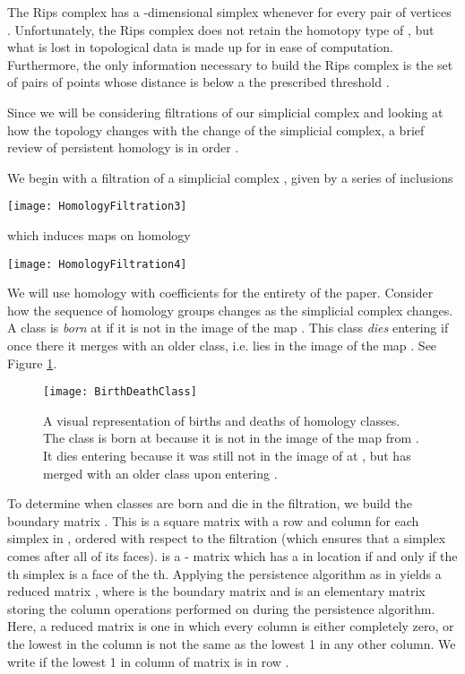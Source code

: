 \documentclass[10pt,twocolumn]{article} \usepackage{amsmath,epsf,amssymb,cite,pifont,amsthm, mathrsfs,epsfig,  bbm, amsthm,  setspace}
\renewcommand{\1}{\mathbbm{1}}
\begin{document}
The Rips complex   has a -dimensional simplex 
whenever  for every pair of vertices .
Unfortunately, the Rips complex does not retain the homotopy type of ,
but what is lost in topological data is made up for in ease of computation.
Furthermore, the only  information necessary
to build the Rips complex is the set of pairs of points whose distance is below a the prescribed threshold .


Since we will be considering filtrations of our simplicial complex and looking at how the topology
changes with the change of the simplicial complex, a brief review of persistent homology is in order \cite{Edelsbrunner2010}.

We begin with a filtration of a simplicial complex , given by a series of inclusions
\begin{center}
 \texttt{[image: HomologyFiltration3]}
\end{center}
which induces maps on homology

\begin{center}
 \texttt{[image: HomologyFiltration4]}
\end{center}
We will use homology with  coefficients for the entirety of the paper.
Consider how the sequence of homology groups changes as the simplicial complex changes.
A class  is {\em born} at  if it is not in the image of the map
.
This class {\em dies} entering  if once there it merges with an older class,
i.e. lies in the image of the map .
See Figure \ref{F:BirthDeathClass}.


\begin{figure}
 \begin{center}
\texttt{[image: BirthDeathClass]}
 \end{center}
 \caption{A visual representation of births and deaths of homology classes.
 The class  is born at  because it is not in the image of the map from .
 It dies entering  because it was still not in the image of  at ,
 but has merged with an older class upon entering .}
\label{F:BirthDeathClass}
\end{figure}

To determine when classes are born and die in the filtration, we build the boundary matrix .
This is a square matrix with a row and column for each simplex in ,
ordered with respect to the filtration (which  ensures that a simplex comes after all of its faces).
 is a - matrix which has a  in location  if and only if the th simplex is a
face of the th.
Applying the persistence algorithm as in \cite{Edelsbrunner2010} yields a reduced matrix ,
where  is the boundary matrix and  is an elementary matrix storing the column operations
performed on  during the persistence algorithm.
Here, a reduced matrix is one in which every column is either completely zero, or the lowest 
in the column is not the same as the lowest 1 in any other column.
We write  if the lowest 1 in column  of matrix  is in row .
\end{document}
